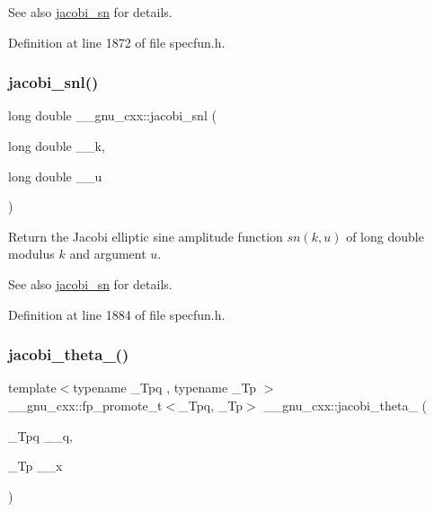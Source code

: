 \begin{DoxySeeAlso}{See also}
\hyperlink{group__gnu__math__spec__func_ga49d5e18152dd0dd0f496b8c8582e7045}{jacobi\+\_\+sn} for details. 
\end{DoxySeeAlso}


Definition at line 1872 of file specfun.\+h.

\mbox{\label{group__gnu__math__spec__func_ga1c13539e3b051a07b1c28aa8a0aeb1b4}} 
\subsubsection{\texorpdfstring{jacobi\+\_\+snl()}{jacobi\_snl()}}
{\footnotesize\ttfamily long double \+\_\+\+\_\+gnu\+\_\+cxx\+::jacobi\+\_\+snl (\begin{DoxyParamCaption}\item[{long double}]{\+\_\+\+\_\+k,  }\item[{long double}]{\+\_\+\+\_\+u }\end{DoxyParamCaption})\hspace{0.3cm}{\ttfamily [inline]}}

Return the Jacobi elliptic sine amplitude function $ sn(k,u) $ of {\ttfamily long double} modulus $ k $ and argument $ u $.

\begin{DoxySeeAlso}{See also}
\hyperlink{group__gnu__math__spec__func_ga49d5e18152dd0dd0f496b8c8582e7045}{jacobi\+\_\+sn} for details. 
\end{DoxySeeAlso}


Definition at line 1884 of file specfun.\+h.

\mbox{\label{group__gnu__math__spec__func_ga996ca8c1fff75e2d4f196e99e0919933}} 
\subsubsection{\texorpdfstring{jacobi\+\_\+theta\+\_()}{jacobi\_theta\_1()}}
{\footnotesize\ttfamily template$<$typename \+\_\+\+Tpq , typename \+\_\+\+Tp $>$ \\
\+\_\+\+\_\+gnu\+\_\+cxx\+::fp\+\_\+promote\+\_\+t$<$\+\_\+\+Tpq, \+\_\+\+Tp$>$ \+\_\+\+\_\+gnu\+\_\+cxx\+::jacobi\+\_\+theta\+\_ (\begin{DoxyParamCaption}\item[{\+\_\+\+Tpq}]{\+\_\+\+\_\+q,  }\item[{\+\_\+\+Tp}]{\+\_\+\+\_\+x }\end{DoxyParamCaption})\hspace{0.3cm}{\ttfamily [inline]}}

